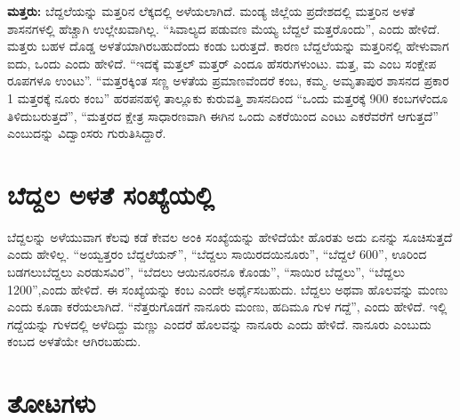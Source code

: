 \textbf{ಮತ್ತರು:} ಬೆದ್ದಲೆಯನ್ನು ಮತ್ತರಿನ ಲೆಕ್ಕದಲ್ಲಿ ಅಳೆಯಲಾಗಿದೆ. ಮಂಡ್ಯ ಜಿಲ್ಲೆಯ ಪ್ರದೇಶದಲ್ಲಿ ಮತ್ತರಿನ ಅಳತೆ ಶಾಸನಗಳಲ್ಲಿ ಹೆಚ್ಚಾಗಿ ಉಲ್ಲೇಖವಾಗಿಲ್ಲ. “ಸಿವಾಲ್ಯದ ಪಡುವಣ ಮೆಯ್ಯ ಬೆದ್ದಲೆ ಮತ್ತರೊಂದು”, ಎಂದು ಹೇಳಿದೆ. ಮತ್ತರು ಬಹಳ ದೊಡ್ಡ ಅಳತೆಯಾಗಿರಬಹುದೆಂದು ಕಂಡು ಬರುತ್ತದೆ. ಕಾರಣ ಬೆದ್ದಲೆಯನ್ನು ಮತ್ತರಿನಲ್ಲಿ ಹೇಳುವಾಗ ಐದು, ಒಂದು ಎಂದು ಹೇಳಿದೆ. “ಇದಕ್ಕೆ ಮತ್ತಲ್​ ಮತ್ತರ್​ ಎಂದೂ ಹೆಸರುಗಳುಂಟು. ಮತ್ತ, ಮ ಎಂಬ ಸಂಕ್ಷೇಪ ರೂಪಗಳೂ ಉಂಟು”. “ಮತ್ತರಕ್ಕಿಂತ ಸಣ್ಣ ಅಳತೆಯ ಪ್ರಮಾಣವೆಂದರೆ ಕಂಬ, ಕಮ್ಮ. ಅಮೃತಾಪುರ ಶಾಸನದ ಪ್ರಕಾರ 1 ಮತ್ತರಕ್ಕೆ ನೂರು ಕಂಬ” ಹರಪನಹಳ್ಳಿ ತಾಲ್ಲೂಕು ಕುರುವತ್ತಿ ಶಾಸನದಿಂದ “ಒಂದು ಮತ್ತರಕ್ಕೆ 900 ಕಂಬಗಳೆಂದೂ ತಿಳಿದುಬರುತ್ತದೆ”, “ಮತ್ತರದ ಕ್ಷೇತ್ರ ಸಾಧಾರಣವಾಗಿ ಈಗಿನ ಒಂದು ಎಕರೆಯಿಂದ ಎಂಟು ಎಕರೆವರೆಗೆ ಆಗುತ್ತದೆ” ಎಂಬುದನ್ನು ವಿದ್ವಾಂಸರು ಗುರುತಿಸಿದ್ದಾರೆ.


\section*{ಬೆದ್ದಲ ಅಳತೆ ಸಂಖ್ಯೆಯಲ್ಲಿ}

ಬೆದ್ದಲನ್ನು ಅಳೆಯುವಾಗ ಕೆಲವು ಕಡೆ ಕೇವಲ ಅಂಕಿ ಸಂಖ್ಯೆಯನ್ನು ಹೇಳಿದೆಯೇ ಹೊರತು ಅದು ಏನನ್ನು ಸೂಚಿಸುತ್ತದೆ ಎಂದು ಹೇಳಿಲ್ಲ. “ಅಯ್ವತ್ತರಂ ಬೆದ್ದಲೆಯನ್​”, “ಬೆದ್ದಲು ಸಾಯಿರದಯಿನೂರು”, “ಬೆದ್ದಲೆ 600”, ಊರಿಂದ ಬಡಗಲುಬೆದ್ದಲು ಎರಡುಸವಿರ”, “ಬೆದಲು ಆಯಿನೂರನೂ ಕೊಂಡು”, “ಸಾಯಿರ ಬೆದ್ದಲು”, “ಬೆದ್ದಲು 1200”,ಎಂದು ಹೇಳಿದೆ. ಈ ಸಂಖ್ಯೆಯನ್ನು ಕಂಬ ಎಂದೇ ಅರ್ಥೈಸಬಹುದು. ಬೆದ್ದಲು ಅಥವಾ ಹೊಲವನ್ನು ಮಂಣು ಎಂದು ಕೂಡಾ ಕರೆಯಲಾಗಿದೆ. “ನೆತ್ತರುಗೊಡಗೆ ನಾನೂರು ಮಂಣು, ಹದಿಮೂ ಗುಳ ಗದ್ದೆ”, ಎಂದು ಹೇಳಿದೆ. ಇಲ್ಲಿ ಗದ್ದೆಯನ್ನು ಗುಳದಲ್ಲಿ ಅಳೆದಿದ್ದು ಮಣ್ಣು ಎಂದರೆ ಹೊಲವನ್ನು ನಾನೂರು ಎಂದು ಹೇಳಿದೆ. ನಾನೂರು ಎಂಬುದು ಕಂಬದ ಅಳತೆಯೇ ಆಗಿರಬಹುದು.


\section*{ತೋಟಗಳು}

